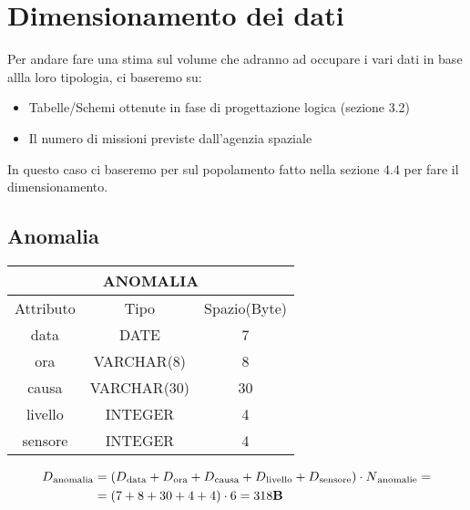 \section{Dimensionamento dei dati}
Per andare fare una stima sul volume che adranno ad occupare i vari dati in base allla loro tipologia, ci baseremo su:
\begin{itemize}
\item Tabelle/Schemi ottenute in fase di progettazione logica (sezione 3.2)
\item Il numero di missioni previste dall'agenzia spaziale
\end{itemize}
In questo caso ci baseremo per sul popolamento fatto nella sezione 4.4 per fare il dimensionamento.
\subsection{Anomalia}
\begin{tabular}{|c|c|c|}
  \hline
  \multicolumn{3}{|c|}{\textbf{ANOMALIA}}\\
  \hline
  Attributo & Tipo & Spazio(Byte) \\
  \hline
  data & DATE & 7 \\
  ora & VARCHAR(8)  & 8 \\
  causa & VARCHAR(30) & 30 \\
  livello & INTEGER & 4 \\
  sensore & INTEGER & 4 \\
  \hline
\end{tabular}
\begin{equation}
  \begin{aligned}
    D{\text{\textsubscript{anomalia}}}&=(D{\text{\textsubscript{data}}} + D{\text{\textsubscript{ora}}} +D{\text{\textsubscript{causa}}} +D{\text{\textsubscript{livello}}} + D{\text{\textsubscript{sensore}}}) \cdot N{\text{\textsubscript{anomalie}}}=\\
    &=(7+8+30+4+4)\cdot 6 = 318\text{\textbf{B}}\\
  \end{aligned}
\end{equation}
